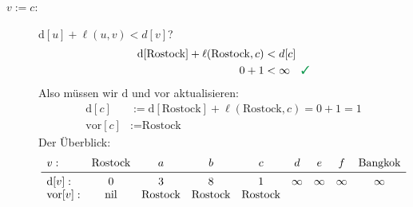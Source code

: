 \documentclass[
a4paper, %
11pt,
]
{scrartcl}
\newcommand{\dist}{\text{d}}
\newcommand{\vor}{\text{vor}}
\newcommand{\nil}{\text{nil}}
\begin{document}
\begin{enumerate}
\begin{description}
      \item[$v := c$:] $\dist[u] + \ell(u, v) < d[v]$?
        \begin{align*}
          \dist[\text{Rostock}] + \ell(\text{Rostock}, c) & < d[c]\\
          0 + 1 & < \infty \quad \richtig
        \end{align*}
        Also müssen wir $\dist$ und $\vor$ aktualisieren:
        \begin{align*}
          \dist[c] & := \dist[\text{Rostock}] + \ell(\text{Rostock}, c)
            = 0 + 1 = 1\\
          \vor[c] & := \text{Rostock}
        \end{align*}
        Der Überblick:
        \begin{align*}
          \begin{array}{lcccccccc}
            v: & \text{Rostock} & a & b & c & d & e & f & \text{Bangkok}\\
            \midrule
            \dist[v]:
              & 0 & 3 & 8 & 1 & \infty & \infty & \infty & \infty\\
            \vor[v]:
              & \nil & \text{Rostock} & \text{Rostock} & \text{Rostock}
          \end{array}
        \end{align*}
    \end{description}


\end{enumerate}
\end{document}
